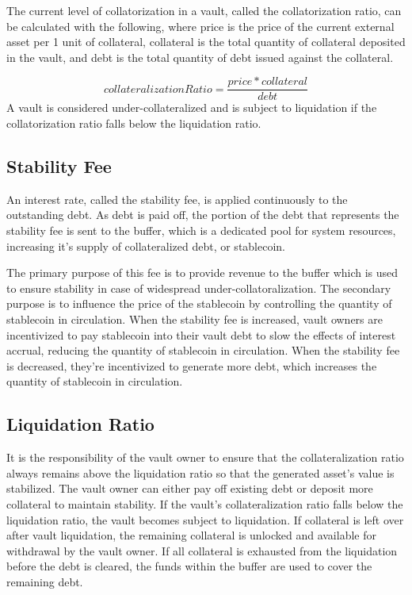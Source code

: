 \documentclass[12pt]{article}
\begin{document}
The current level of collatorization in a vault, called the collatorization ratio, can be calculated with the following, where price is the price of the current external asset per 1 unit of collateral, collateral is the total quantity of collateral deposited in the vault, and debt is the total quantity of debt issued against the collateral.

\begin{equation*}
	collateralizationRatio = \frac{price * collateral}{debt}
\end{equation*}
A vault is considered under-collateralized and is subject to liquidation if the collatorization ratio falls below the liquidation ratio.



\subsection{Stability Fee}

An interest rate, called the stability fee, is applied continuously to the outstanding debt. As debt is paid off, the portion of the debt that represents the stability fee is sent to the buffer, which is a dedicated pool for system resources, increasing it's supply of collateralized debt, or stablecoin.

The primary purpose of this fee is to provide revenue to the buffer which is used to ensure stability in case of widespread under-collatoralization. The secondary purpose is to influence the price of the stablecoin by controlling the quantity of stablecoin in circulation. When the stability fee is increased, vault owners are incentivized to pay stablecoin into their vault debt to slow the effects of interest accrual, reducing the quantity of stablecoin in circulation. When the stability fee is decreased, they're incentivized to generate more debt, which increases the quantity of stablecoin in circulation.

\subsection{Liquidation Ratio}

It is the responsibility of the vault owner to ensure that the collateralization ratio always remains above the liquidation ratio so that the generated asset's value is stabilized. The vault owner can either pay off existing debt or deposit more collateral to maintain stability. If the vault's collateralization ratio falls below the liquidation ratio, the vault becomes subject to liquidation. If collateral is left over after vault liquidation, the remaining collateral is unlocked and available for withdrawal by the vault owner. If all collateral is exhausted from the liquidation before the debt is cleared, the funds within the buffer are used to cover the remaining debt.
\end{document}
